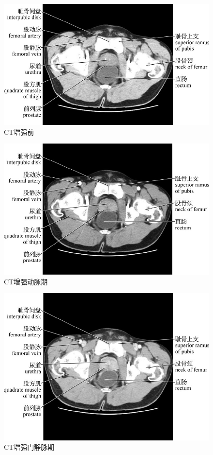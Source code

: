 \begin{figure}[!htbp]
 \centering
 \includegraphics{./images/Image00161.jpg}
 \captionsetup{justification=centering}
 \caption{CT增强前}
  \end{figure} 
 \FloatBarrier

\begin{figure}[!htbp]
 \centering
 \includegraphics{./images/Image00162.jpg}
 \captionsetup{justification=centering}
 \caption{CT增强动脉期}
  \end{figure} 
 \FloatBarrier

\begin{figure}[!htbp]
 \centering
 \includegraphics{./images/Image00163.jpg}
 \captionsetup{justification=centering}
 \caption{CT增强门静脉期}
  \end{figure} 
 \FloatBarrier

